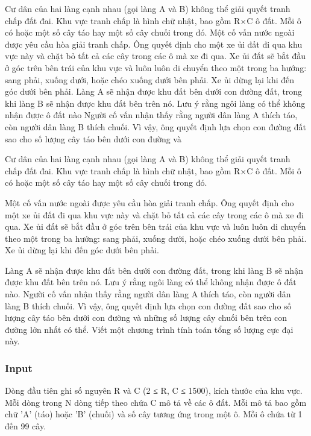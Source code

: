 



     Cư dân của hai làng cạnh nhau (gọi làng A và B) không thể giải quyết tranh chấp đất đai. Khu       vực tranh chấp là hình chữ nhật, bao gồm R×C ô đất. Mỗi ô có hoặc một số cây táo hay một số       cây chuối trong đó.       Một cố vấn nước ngoài được yêu cầu hòa giải tranh chấp. Ông quyết định cho một xe ủi đất đi       qua khu vực này và chặt bỏ tất cả các cây trong các ô mà xe đi qua. Xe ủi đất sẽ bắt đầu ở góc       trên bên trái của khu vực và luôn luôn di chuyển theo một trong ba hướng: sang phải, xuống       dưới, hoặc chéo xuống dưới bên phải. Xe ủi dừng lại khi đến góc dưới bên phải.       Làng A sẽ nhận được khu đất bên dưới con đường đất, trong khi làng B sẽ nhận được khu đất       bên trên nó. Lưu ý rằng ngôi làng có thể không nhận được ô đất nào       Người cố vấn nhận thấy rằng người dân làng A thích táo, còn người dân làng B thích chuối. Vì       vậy, ông quyết định lựa chọn con đường đất sao cho số lượng cây táo bên dưới con đường và    

   Cư dân của hai làng cạnh nhau (gọi làng A và B) không thể giải quyết tranh chấp đất đai. Khu vực tranh chấp là hình chữ nhật, bao gồm R×C ô đất. Mỗi ô có hoặc một số cây táo hay một số cây chuối trong đó.  

   Một cố vấn nước ngoài được yêu cầu hòa giải tranh chấp. Ông quyết định cho một xe ủi đất đi qua khu vực này và chặt bỏ tất cả các cây trong các ô mà xe đi qua. Xe ủi đất sẽ bắt đầu ở góc trên bên trái của khu vực và luôn luôn di chuyển theo một trong ba hướng: sang phải, xuống dưới, hoặc chéo xuống dưới bên phải. Xe ủi dừng lại khi đến góc dưới bên phải.  

   Làng A sẽ nhận được khu đất bên dưới con đường đất, trong khi làng B sẽ nhận được khu đất bên trên nó. Lưu ý rằng ngôi làng có thể không nhận được ô đất nào. Người cố vấn nhận thấy rằng người dân làng A thích táo, còn người dân làng B thích chuối. Vì vậy, ông quyết định lựa chọn con đường đất sao cho số lượng cây táo bên dưới con đường và những số lượng cây chuối bên trên con đường lớn nhất có thể. Viết một chương trình tính toán tổng số lượng cực đại này.  



\subsubsection{   Input  }

   Dòng đầu tiên ghi số nguyên R và C (2 ≤ R, C ≤ 1500), kích thước của khu vực. Mỗi dòng trong N dòng tiếp theo chứa C mô tả về các ô đất. Mỗi mô tả bao gồm chữ 'A' (táo) hoặc 'B' (chuối) và số cây tương ứng trong một ô. Mỗi ô chứa từ 1 đến 99 cây.  

